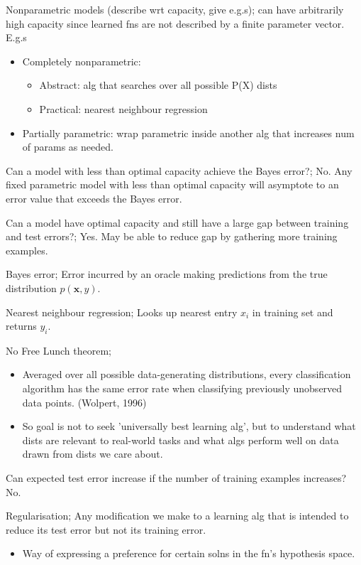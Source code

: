 \documentclass{article}
\begin{document}
Nonparametric models (describe wrt capacity, give e.g.s); can have arbitrarily high capacity since learned fns are not described by a finite parameter vector. E.g.s \begin{itemize} \item Completely nonparametric: \begin{itemize} \item Abstract: alg that searches over all possible P(X) dists \item Practical: nearest neighbour regression \end{itemize} \item Partially parametric: wrap parametric inside another alg that increases num of params as needed.  \end{itemize}

Can a model with less than optimal capacity achieve the Bayes error?; No. Any fixed parametric model with less than optimal capacity will asymptote to an error value that exceeds the Bayes error.

Can a model have optimal capacity and still have a large gap between training and test errors?; Yes. May be able to reduce gap by gathering more training examples.

Bayes error; Error incurred by an oracle making predictions from the true distribution $p(\mathbf{x},y)$.

Nearest neighbour regression; Looks up nearest entry $x_i$ in training set and returns $y_i$.

No Free Lunch theorem; \begin{itemize} \item Averaged over all possible data-generating distributions, every classification algorithm has the same error rate when classifying previously unobserved data points. (Wolpert, 1996) \item So goal is not to seek 'universally best learning alg', but to understand what dists are relevant to real-world tasks and what algs perform well on data drawn from dists we care about.  \end{itemize} Can expected test error increase if the number of training examples increases? No.

Regularisation; Any modification we make to a learning alg that is intended to reduce its test error but not its training error. \begin{itemize} \item Way of expressing a preference for certain solns in the fn's hypothesis space.  \end{itemize}
\end{document}
